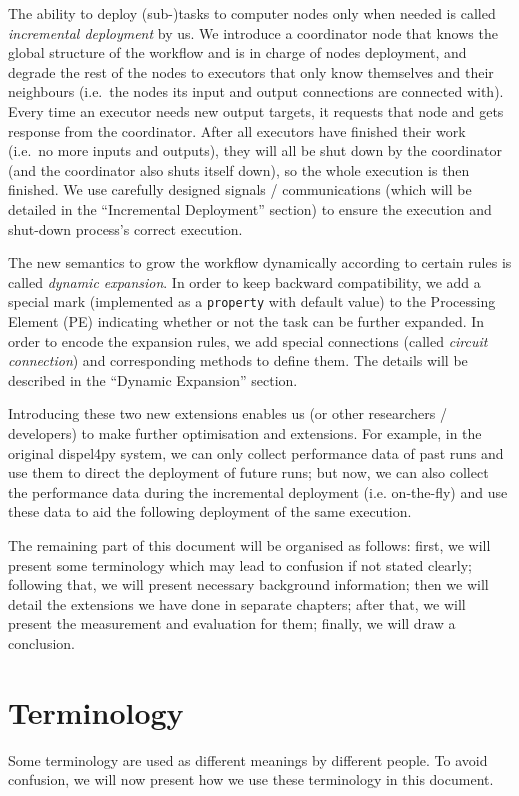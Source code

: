 \documentclass[•]{article}
\begin{document}
	The ability to deploy (sub-)tasks to computer nodes only when needed is called \emph{incremental deployment} by us. We introduce a coordinator node that knows the global structure of the workflow and is in charge of nodes deployment, and degrade the rest of the nodes to executors that only know themselves and their neighbours (i.e.\ the nodes its input and output connections are connected with). Every time an executor needs new output targets, it requests that node and gets response from the coordinator. After all executors have finished their work (i.e.\ no more inputs and outputs), they will all be shut down by the coordinator (and the coordinator also shuts itself down), so the whole execution is then finished. We use carefully designed signals / communications (which will be detailed in the ``Incremental Deployment'' section) to ensure the execution and shut-down process's correct execution.
	
	The new semantics to grow the workflow dynamically according to certain rules is called \emph{dynamic expansion}. In order to keep backward compatibility, we add a special mark (implemented as a \lstinline|property| with default value) to the Processing Element (PE) indicating whether or not the task can be further expanded. In order to encode the expansion rules, we add special connections (called \emph{circuit connection}) and corresponding methods to define them. The details will be described in the ``Dynamic Expansion'' section.
	
	Introducing these two new extensions enables us (or other researchers / developers) to make further optimisation and extensions. For example, in the original dispel4py system, we can only collect performance data of past runs and use them to direct the deployment of future runs; but now, we can also collect the performance data during the incremental deployment (i.e. on-the-fly) and use these data to aid the following deployment of the same execution.
	
	The remaining part of this document will be organised as follows: first, we will present some terminology which may lead to confusion if not stated clearly; following that, we will present necessary background information; then we will detail the extensions we have done in separate chapters; after that, we will present the measurement and evaluation for them; finally, we will draw a conclusion.
	
	\section{Terminology}
	Some terminology are used as different meanings by different people. To avoid confusion, we will now present how we use these terminology in this document.
	
\end{document}
